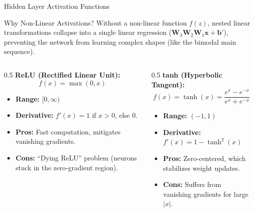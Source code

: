 \documentclass[9pt]{beamer}
\begin{document}
\begin{frame}{Hidden Layer Activation Functions}
  \begin{block}{Why Non-Linear Activations?}
    Without a non-linear function $f(z)$, nested linear transformations collapse into a single linear regression ($\mathbf{W}_3 \mathbf{W}_2 \mathbf{W}_1 \mathbf{x} + \mathbf{b}'$), preventing the network from learning complex shapes (like the bimodal main sequence).
  \end{block}
  \begin{columns}
    \begin{column}{0.5\textwidth}
      \alert{\textbf{ReLU (Rectified Linear Unit):}}
      $$f(x) = \max(0, x)$$
      \begin{itemize}
        \item \textbf{Range:} $[0, \infty)$
        \item \textbf{Derivative:} $f'(x) = 1$ if $x > 0$, else $0$.
        \item \textbf{Pros:} Fast computation, mitigates vanishing gradients.
        \item \textbf{Cons:} ``Dying ReLU'' problem (neurons stuck in the zero-gradient region).
      \end{itemize}
    \end{column}
    \begin{column}{0.5\textwidth}
      \alert{\textbf{tanh (Hyperbolic Tangent):}}
      $$f(x) = \tanh(x) = \frac{e^x - e^{-x}}{e^x + e^{-x}}$$
      \begin{itemize}
        \item \textbf{Range:} $(-1, 1)$
        \item \textbf{Derivative:} $f'(x) = 1 - \tanh^2(x)$
        \item \textbf{Pros:} Zero-centered, which stabilizes weight updates.
        \item \textbf{Cons:} Suffers from vanishing gradients for large $|x|$.
      \end{itemize}
    \end{column}
  \end{columns}
\end{frame}
\end{document}
